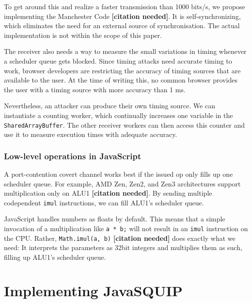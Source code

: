 \documentclass[11pt,
  titlepage=false,
]{scrreprt}
\begin{document}
To get around this and realize a faster transmission than 1000 bits/s, we propose implementing the Manchester Code \textbf{[citation needed]}.
It is self-synchronizing, which eliminates the need for an external source of synchronisation.
The actual implementation is not within the scope of this paper.

The receiver also needs a way to measure the small variations in timing whenever a scheduler queue gets blocked.
Since timing attacks need accurate timing to work, browser developers are restricting the accuracy of timing sources that are available to the user.
At the time of writing this, no common browser provides the user with a timing source with more accuracy than 1 ms.

Nevertheless, an attacker can produce their own timing source.
We can instantiate a counting worker, which continually increases one variable in the \texttt{SharedArrayBuffer}.
The other receiver workers can then access this counter and use it to measure execution times with adequate accuracy.

\subsection{Low-level operations in JavaScript}\label{subsec:lowleveljs}
A port-contention covert channel works best if the issued \textmu op only fills up one scheduler queue.
For example, AMD Zen, Zen2, and Zen3 architectures support multiplication only on ALU1 \textbf{[citation needed]}.
By sending multiple codependent \texttt{imul} instructions, we can fill ALU1's scheduler queue.

JavaScript handles numbers as floats by default.
This means that a simple invocation of a multiplication like \texttt{a * b;} will not result in an \texttt{imul} instruction on the CPU.
Rather, \texttt{Math.imul(a, b)} \textbf{[citation needed]} does exactly what we need:
It interprets the parameters as 32bit integers and multiplies them as such, filling up ALU1's scheduler queue.


\chapter{Implementing JavaSQUIP}
\label{ch:implementation}

\end{document}
